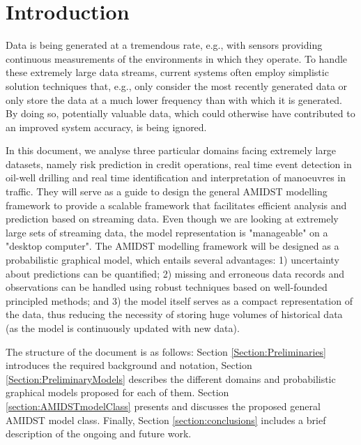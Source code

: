 \section{Introduction}

Data is being generated at a tremendous rate, e.g., with sensors providing continuous measurements of the environments in which they operate. To handle these extremely large data streams, current systems often employ simplistic solution techniques that, e.g., only consider the most recently generated data or only store the data at a much lower frequency than with which it is generated. By doing so, potentially valuable data, which could otherwise have contributed to an improved system accuracy, is being ignored. 

In this document, we analyse three particular domains facing extremely large datasets, namely risk prediction in credit operations, real time event detection in oil-well drilling and real time identification and interpretation of manoeuvres in traffic. They will serve as a guide to design the general AMIDST modelling framework to provide a scalable framework that facilitates efficient analysis and prediction based on streaming data. Even though we are looking at extremely large sets of streaming data, the model representation is "manageable" on a "desktop computer". The AMIDST modelling framework will be designed as a probabilistic graphical model, which entails several advantages: 1) uncertainty about predictions can be quantified; 2) missing and erroneous data records and observations can be handled using robust techniques based on well-founded principled methods; and 3) the model itself serves as a compact representation of the data, thus reducing the necessity of storing huge volumes of historical data (as the model is continuously updated with new data).

The structure of the document is as follows: Section \ref{Section:Preliminaries} introduces the required background and notation, Section \ref{Section:PreliminaryModels} describes the different domains and probabilistic graphical models proposed for each of them. Section \ref{section:AMIDSTmodelClass} presents and discusses the proposed general AMIDST model class. Finally, Section \ref{section:conclusions} includes a brief description of the ongoing and future work.